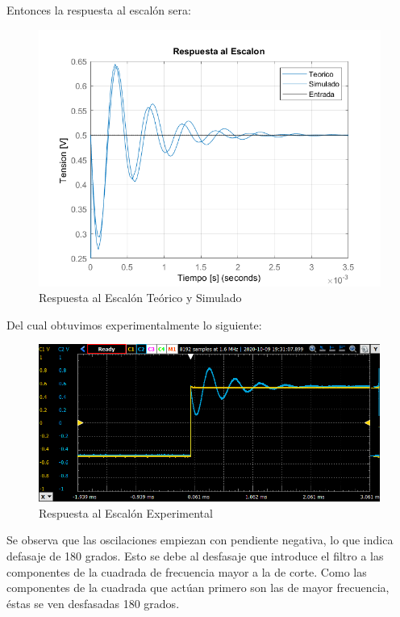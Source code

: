 Entonces la respuesta al escalón sera:

\begin{figure}[H]
    \centering
    \includegraphics[scale = 0.8]{../Ejercicio1-FiltroConGIC/Informe/re.png}
    \caption{Respuesta al Escalón Teórico y Simulado}
    \label{ej1reteo}
\end{figure}

Del cual obtuvimos experimentalmente lo siguiente:

\begin{figure}[H]
    \centering
    \includegraphics[scale = 0.8]{../Ejercicio1-FiltroConGIC/Informe/re1.png}
    \caption{Respuesta al Escalón Experimental}
    \label{ej1reexp}
\end{figure}

Se observa que las oscilaciones empiezan con pendiente negativa, lo que indica defasaje de 180 grados. Esto se debe al desfasaje que introduce el filtro a las componentes de la cuadrada de frecuencia mayor a la de corte. Como las componentes de la cuadrada que actúan primero son las de mayor frecuencia, éstas se ven desfasadas 180 grados. 

